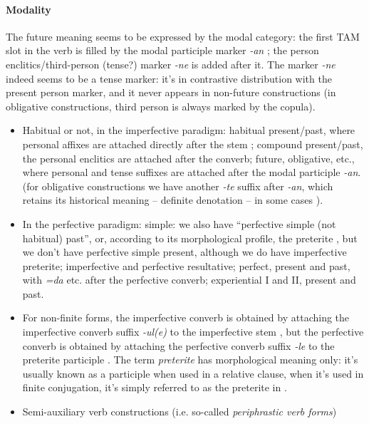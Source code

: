 \documentclass[a4paper, oneside, 12pt]{report}
\newcommand*{\citesec}[1]{\S~{#1}}
\newcommand*{\citepage}[1]{p.~{#1}}
\newcommand*{\citepages}[1]{pp.~{#1}}
\newcommand*{\term}[1]{\emph{#1}}
\newcommand{\form}[1]{\emph{#1}}
\begin{document}
\paragraph*{Modality} 
The future meaning seems to be expressed by  
the modal category: the first TAM slot in the verb is filled by 
the modal participle marker \form{-an} \citep[\citepage{18.1.2.2}]{forker2020grammar};
the person enclitics/third-person (tense?) marker \form{-ne} is added after it.
The marker \form{-ne} indeed seems to be a tense marker: 
it's in contrastive distribution with the present person marker,
and it never appears in non-future constructions
(in obligative constructions, third person is always marked by the copula).

\begin{itemize}
    \item Habitual or not, in the imperfective paradigm: 
    habitual present/past, where personal affixes are attached  
    directly after the stem \citep[\citepages{243, 246}]{forker2020grammar};
    compound present/past, the personal enclitics are attached 
    after the converb; 
    future, obligative, etc., where personal and tense suffixes are attached 
    after the modal participle \form{-an}. 
    (for obligative constructions we have another \form{-te} suffix after \form{-an},
    which retains its historical meaning -- definite denotation -- 
    in some cases \citep[\citepage{256}]{forker2020grammar}).

    \item In the perfective paradigm:
    simple: we also have ``perfective simple (not habitual) past'', 
    or, according to its morphological profile, the preterite 
    \citep[\citesec{14.2.2}]{forker2020grammar},
    but we don't have perfective simple present,
    although we do have imperfective preterite;
    imperfective and perfective resultative; 
    perfect, present and past, with \form{=da} etc. after the perfective converb; 
    experiential I and II, present and past. 
    \item For non-finite forms, the imperfective converb 
    is obtained by attaching the imperfective converb suffix \form{-ul(e)} to the imperfective stem
    \citep[\citepage{306}]{forker2020grammar},
    but the perfective converb is obtained by 
    attaching the perfective converb suffix \form{-le} to the preterite participle 
    \citep[\citepage{308}]{forker2020grammar}.
    The term \term{preterite} has morphological meaning only:
    it's usually known as a participle when used in a relative clause, 
    when it's used in finite conjugation, 
    it's simply referred to as the preterite in \citet{forker2020grammar}.
    \item Semi-auxiliary verb constructions (i.e. so-called \term{periphrastic verb forms})
\end{itemize}
\end{document}
